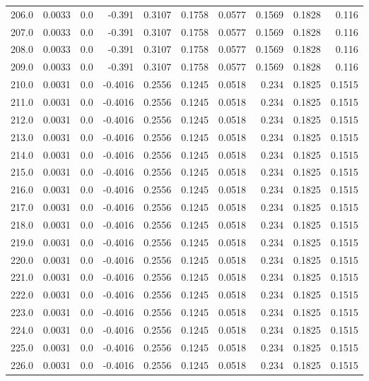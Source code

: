 \begin{longtable}{lrrrrrrrrr}
206.0 & 0.0033 & 0.0 & -0.391 & 0.3107 & 0.1758 & 0.0577 & 0.1569 & 0.1828 & 0.116 \\
207.0 & 0.0033 & 0.0 & -0.391 & 0.3107 & 0.1758 & 0.0577 & 0.1569 & 0.1828 & 0.116 \\
208.0 & 0.0033 & 0.0 & -0.391 & 0.3107 & 0.1758 & 0.0577 & 0.1569 & 0.1828 & 0.116 \\
209.0 & 0.0033 & 0.0 & -0.391 & 0.3107 & 0.1758 & 0.0577 & 0.1569 & 0.1828 & 0.116 \\
210.0 & 0.0031 & 0.0 & -0.4016 & 0.2556 & 0.1245 & 0.0518 & 0.234 & 0.1825 & 0.1515 \\
211.0 & 0.0031 & 0.0 & -0.4016 & 0.2556 & 0.1245 & 0.0518 & 0.234 & 0.1825 & 0.1515 \\
212.0 & 0.0031 & 0.0 & -0.4016 & 0.2556 & 0.1245 & 0.0518 & 0.234 & 0.1825 & 0.1515 \\
213.0 & 0.0031 & 0.0 & -0.4016 & 0.2556 & 0.1245 & 0.0518 & 0.234 & 0.1825 & 0.1515 \\
214.0 & 0.0031 & 0.0 & -0.4016 & 0.2556 & 0.1245 & 0.0518 & 0.234 & 0.1825 & 0.1515 \\
215.0 & 0.0031 & 0.0 & -0.4016 & 0.2556 & 0.1245 & 0.0518 & 0.234 & 0.1825 & 0.1515 \\
216.0 & 0.0031 & 0.0 & -0.4016 & 0.2556 & 0.1245 & 0.0518 & 0.234 & 0.1825 & 0.1515 \\
217.0 & 0.0031 & 0.0 & -0.4016 & 0.2556 & 0.1245 & 0.0518 & 0.234 & 0.1825 & 0.1515 \\
218.0 & 0.0031 & 0.0 & -0.4016 & 0.2556 & 0.1245 & 0.0518 & 0.234 & 0.1825 & 0.1515 \\
219.0 & 0.0031 & 0.0 & -0.4016 & 0.2556 & 0.1245 & 0.0518 & 0.234 & 0.1825 & 0.1515 \\
220.0 & 0.0031 & 0.0 & -0.4016 & 0.2556 & 0.1245 & 0.0518 & 0.234 & 0.1825 & 0.1515 \\
221.0 & 0.0031 & 0.0 & -0.4016 & 0.2556 & 0.1245 & 0.0518 & 0.234 & 0.1825 & 0.1515 \\
222.0 & 0.0031 & 0.0 & -0.4016 & 0.2556 & 0.1245 & 0.0518 & 0.234 & 0.1825 & 0.1515 \\
223.0 & 0.0031 & 0.0 & -0.4016 & 0.2556 & 0.1245 & 0.0518 & 0.234 & 0.1825 & 0.1515 \\
224.0 & 0.0031 & 0.0 & -0.4016 & 0.2556 & 0.1245 & 0.0518 & 0.234 & 0.1825 & 0.1515 \\
225.0 & 0.0031 & 0.0 & -0.4016 & 0.2556 & 0.1245 & 0.0518 & 0.234 & 0.1825 & 0.1515 \\
226.0 & 0.0031 & 0.0 & -0.4016 & 0.2556 & 0.1245 & 0.0518 & 0.234 & 0.1825 & 0.1515 \\

\end{longtable}
